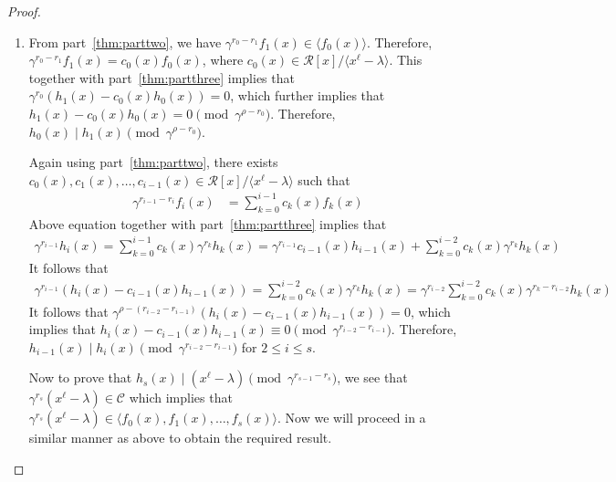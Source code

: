 \documentclass[10pt,a4paper]{amsart}
\begin{document}
\begin{proof}
\begin{enumerate}
        Now we prove the result for $i=k$. We have $\gamma^{r_{i-1}-r_i}f_i(x) \in \langle f_0(x), f_1(x), \dots, f_{i-1}(x) \rangle$ by part~\ref{thm:parttwo}. Therefore, there exist polynomials $c_0(x),c_1(x),\dots,c_{k-1}(x)$ in $ \mathcal{R}[x]/ \langle x^{\ell}-\lambda \rangle$ such that
        \begin{align*}
            \gamma^{r_{k-1}-r_k}f_k(x) = \sum_{i=0}^{k-1}c_i(x)f_i(x)
            =\sum_{i=0}^{k-1}\gamma^{r_i}c_i(x)h_i(x)=\gamma^{r_{k-1}}\sum_{i=0}^{k-1}\gamma^{r_i-r_{k-1}}c_k(x)h_k(x)
        \end{align*}
        
        It follows that $\gamma^{\rho-r_k}f_k(x)=0$ and therefore, $f_k(x)=\gamma^{r_k}h_k(x)$, where $h_k(x)$ is a monic polynomial.
        
        Hence, $f_i(x)=\gamma^{r_i}h_i(x)$, where $h_i(x)$ is a monic polynomial for $0 \le i \le s$, by mathematical induction.
        
        \item From part~\ref{thm:parttwo}, we have $\gamma^{r_0-r_1}f_1(x) \in \langle f_0(x) \rangle$. Therefore, $\gamma^{r_0-r_1}f_1(x)=c_0(x)f_0(x)$, where $c_0(x) \in \mathcal{R}[x]/\langle x^{\ell}-\lambda \rangle$. This together with part~\ref{thm:partthree} implies that $\gamma^{r_0}(h_1(x)-c_0(x)h_0(x))=0$, which further implies that $h_1(x)-c_0(x)h_0(x)=0 \pmod{\gamma^{\rho-r_0}}$. Therefore, $h_0(x) \mid h_1(x) \pmod{\gamma^{\rho-r_0}}$.

        Again using part~\ref{thm:parttwo}, there exists $c_0(x),c_1(x), \dots, c_{i-1}(x) \in \mathcal{R}[x]/\langle x^{\ell}-\lambda\rangle$ such that
        \begin{align*}
            \gamma^{r_{i-1}-r_i}f_i(x)&=\sum_{k=0}^{i-1}c_k(x)f_k(x)
        \end{align*}
        Above equation together with part~\ref{thm:partthree} implies that
        \begin{align*}
            \gamma^{r_{i-1}}h_i(x)=\sum_{k=0}^{i-1}c_k(x)\gamma^{r_k}h_k(x)=\gamma^{r_{i-1}}c_{i-1}(x)h_{i-1}(x)+\sum_{k=0}^{i-2}c_k(x)\gamma^{r_k}h_k(x)
        \end{align*}
        It follows that
        \begin{align*}
            \gamma^{r_{i-1}}(h_i(x)-c_{i-1}(x)h_{i-1}(x))=\sum_{k=0}^{i-2}c_k(x)\gamma^{r_k}h_k(x)=\gamma^{r_{i-2}}\sum_{k=0}^{i-2}c_k(x)\gamma^{r_k-r_{i-2}}h_k(x)
        \end{align*}
           It follows that $\gamma^{\rho-(r_{i-2}-r_{i-1})}(h_i(x)-c_{i-1}(x)h_{i-1}(x))=0$, which implies that $h_i(x)-c_{i-1}(x)h_{i-1}(x)\equiv 0 \pmod{\gamma^{r_{i-2}-r_{i-1}}}$. Therefore, $h_{i-1}(x) \mid h_i(x) \pmod{\gamma^{r_{i-2}-r_{i-1}}}$ for $2 \le i \le s$.

        Now to prove that $h_s(x) \mid (x^{\ell}-\lambda) \pmod{\gamma^{r_{s-1}-r_s}}$, we see that $\gamma^{r_s}(x^{\ell}-\lambda) \in \mathcal{C}$ which implies that $\gamma^{r_s}(x^{\ell}-\lambda) \in \langle f_0(x),f_1(x), \dots, f_s(x) \rangle$. Now we will proceed in a similar manner as above to obtain the required result.
    \end{enumerate}
\end{proof}
\end{document}
